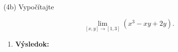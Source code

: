 \pr (4b)
Vypočítajte

$$
\lim\limits_{
[x,y]\rightarrow [1,3]}
(x^3-xy+2y).
$$

\begin{enumerate}
\item[]\textbf{Výsledok:}\gr
\end{enumerate}
